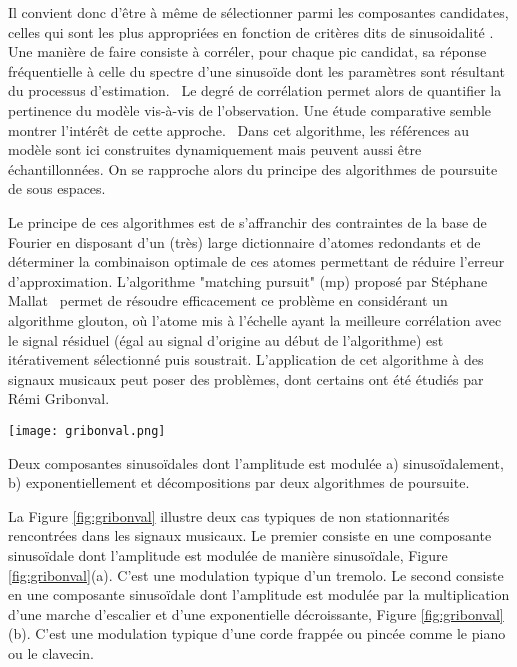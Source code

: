 Il convient donc d'être à même de sélectionner parmi les composantes candidates, celles qui sont les plus appropriées en fonction de critères dits de \og sinusoidalité \fg. Une manière de faire consiste à corréler, pour chaque pic candidat, sa réponse fréquentielle à celle du spectre d'une sinusoïde dont les paramètres sont résultant du processus d'estimation.~\cite{peak-selection} Le degré de corrélation permet alors de quantifier la pertinence du modèle vis-à-vis de l'observation. Une étude comparative semble montrer l'intérêt de cette approche.~\cite{wells2010comparative} Dans cet algorithme, les références au modèle sont ici construites dynamiquement mais peuvent aussi être échantillonnées. On se rapproche alors du principe des algorithmes de poursuite de sous espaces.

Le principe de ces algorithmes est de s'affranchir des contraintes de la base de Fourier en disposant d'un (très) large dictionnaire d'atomes redondants et de déterminer la combinaison optimale de ces atomes permettant de réduire l'erreur d'approximation. L'algorithme "matching pursuit" (mp) proposé par Stéphane Mallat~\cite{mallat1993matching} permet de résoudre efficacement ce problème en considérant un algorithme glouton, où l'atome mis à l'échelle ayant la meilleure corrélation avec le signal résiduel (égal au signal d'origine au début de l'algorithme) est itérativement sélectionné puis soustrait. L'application de cet algorithme à des signaux musicaux peut poser des problèmes, dont certains ont été étudiés par Rémi Gribonval.~\cite{gribonval1996sound} %

\begin{marginfigure}
  \texttt{[image: gribonval.png]}
  \caption{Deux composantes sinusoïdales dont l'amplitude est modulée a) sinusoïdalement, b) exponentiellement et décompositions par deux algorithmes de poursuite.}
  \label{fig:gribonval}
\end{marginfigure}

La Figure \ref{fig:gribonval} illustre deux cas typiques de non stationnarités rencontrées dans les signaux musicaux. Le premier consiste en une composante sinusoïdale dont l'amplitude est modulée de manière sinusoïdale, Figure \ref{fig:gribonval}(a). C'est une modulation typique d'un tremolo. Le second consiste en une composante sinusoïdale dont l'amplitude est modulée par la multiplication d'une marche d'escalier et d'une exponentielle décroissante, Figure \ref{fig:gribonval}(b). C'est une modulation typique d'une corde frappée ou pincée comme le piano ou le clavecin.

